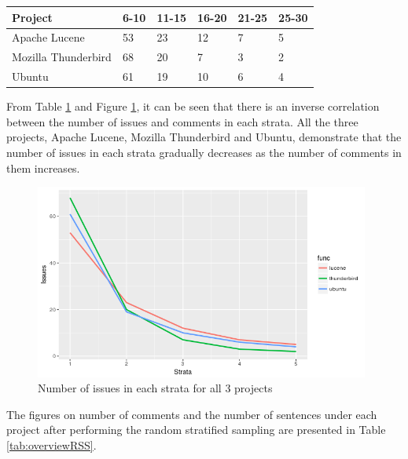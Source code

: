 \documentclass[a4paper,12pt,twoside]{report}
\begin{document}
\begin{table} %
    \centering
    \begin{adjustbox}{max width=\columnwidth}
    \def\arraystretch{1} %
    \begin{tabular}{p{4cm} p{2cm} p{2cm} p{2cm} p{2cm} p{2cm}}
        \toprule
        \textbf{Project} & \textbf{6-10} & \textbf{11-15} & \textbf{16-20} & \textbf{21-25} & \textbf{25-30}\\
        \midrule
			Apache Lucene & 53 & 23 & 12 & 7 & 5\\
			Mozilla Thunderbird & 68 & 20 & 7 & 3 & 2\\ 
			Ubuntu & 61 & 19 & 10 & 6 & 4\\
        \midrule
    \end{tabular}
    \end{adjustbox}
    \label{tab:strataProportion}
\end{table}

From Table \ref{tab:strataProportion} and Figure \ref{fig:multilineStrata}, it can be seen that there is an inverse correlation between the number of issues and comments in each strata. All the three projects, Apache Lucene, Mozilla Thunderbird and Ubuntu, demonstrate that the number of issues in each strata gradually decreases as the number of comments in them increases. 
\bigbreak
\begin{figure}[h] %
    \centering
    \includegraphics[width=11cm]{rss-multi-line-plot}
    \caption{Number of issues in each strata for all 3 projects}
    \label{fig:multilineStrata}
\end{figure}
The figures on number of comments and the number of sentences under each project after performing the random stratified sampling are presented in Table \ref{tab:overviewRSS}. 
\end{document}
